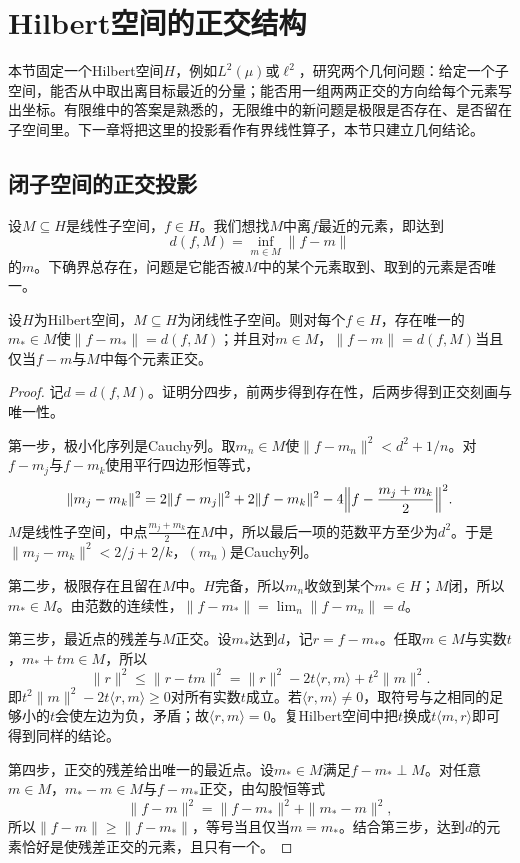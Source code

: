 
\section{Hilbert空间的正交结构}
\label{sec:fs-orthogonal}

本节固定一个Hilbert空间$H$，例如$L^2(\mu)$或$\ell^2$，研究两个几何问题：给定一个子空间，能否从中取出离目标最近的分量；能否用一组两两正交的方向给每个元素写出坐标。有限维中的答案是熟悉的，无限维中的新问题是极限是否存在、是否留在子空间里。下一章将把这里的投影看作有界线性算子，本节只建立几何结论。

\subsection{闭子空间的正交投影}
\label{sec:fs-projection}

设$M\subseteq H$是线性子空间，$f\in H$。我们想找$M$中离$f$最近的元素，即达到
\[
 d(f,M)=\inf_{m\in M}\|f-m\|
\]
的$m$。下确界总存在，问题是它能否被$M$中的某个元素取到、取到的元素是否唯一。

\begin{theorem}[闭子空间上的正交投影]
\label{thm:fs-projection}
设$H$为Hilbert空间，$M\subseteq H$为闭线性子空间。则对每个$f\in H$，存在唯一的$m_*\in M$使$\|f-m_*\|=d(f,M)$；并且对$m\in M$，$\|f-m\|=d(f,M)$当且仅当$f-m$与$M$中每个元素正交。
\end{theorem}

\begin{proof}
记$d=d(f,M)$。证明分四步，前两步得到存在性，后两步得到正交刻画与唯一性。

第一步，极小化序列是Cauchy列。取$m_n\in M$使$\|f-m_n\|^2<d^2+1/n$。对$f-m_j$与$f-m_k$使用平行四边形恒等式，
\[
 \|m_j-m_k\|^2=2\|f-m_j\|^2+2\|f-m_k\|^2-4\Bigl\|f-\frac{m_j+m_k}{2}\Bigr\|^2 .
\]
$M$是线性子空间，中点$\tfrac{m_j+m_k}2$在$M$中，所以最后一项的范数平方至少为$d^2$。于是$\|m_j-m_k\|^2<2/j+2/k$，$(m_n)$是Cauchy列。

第二步，极限存在且留在$M$中。$H$完备，所以$m_n$收敛到某个$m_*\in H$；$M$闭，所以$m_*\in M$。由范数的连续性，$\|f-m_*\|=\lim_n\|f-m_n\|=d$。

第三步，最近点的残差与$M$正交。设$m_*$达到$d$，记$r=f-m_*$。任取$m\in M$与实数$t$，$m_*+tm\in M$，所以
\[
 \|r\|^2\leq\|r-tm\|^2=\|r\|^2-2t\langle r,m\rangle+t^2\|m\|^2 .
\]
即$t^2\|m\|^2-2t\langle r,m\rangle\geq0$对所有实数$t$成立。若$\langle r,m\rangle\neq0$，取符号与之相同的足够小的$t$会使左边为负，矛盾；故$\langle r,m\rangle=0$。复Hilbert空间中把$t$换成$t\langle m,r\rangle$即可得到同样的结论。

第四步，正交的残差给出唯一的最近点。设$m_*\in M$满足$f-m_*\perp M$。对任意$m\in M$，$m_*-m\in M$与$f-m_*$正交，由勾股恒等式
\[
 \|f-m\|^2=\|f-m_*\|^2+\|m_*-m\|^2 ,
\]
所以$\|f-m\|\geq\|f-m_*\|$，等号当且仅当$m=m_*$。结合第三步，达到$d$的元素恰好是使残差正交的元素，且只有一个。
\end{proof}

